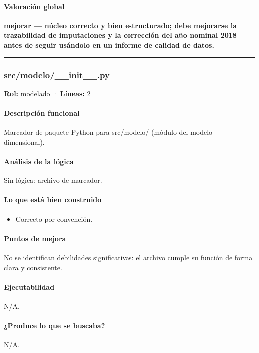 \paragraph{Valoración global}
\textbf{mejorar --- núcleo correcto y bien estructurado; debe mejorarse la trazabilidad de imputaciones y la corrección del año nominal 2018 antes de seguir usándolo en un informe de calidad de datos.}

\medskip
\hrule

\subsubsection{src/modelo/\_\_init\_\_.py}
\textbf{Rol:} modelado · \textbf{Líneas:} 2

\paragraph{Descripción funcional}
Marcador de paquete Python para src/modelo/ (módulo del modelo dimensional).

\paragraph{Análisis de la lógica}
Sin lógica: archivo de marcador.

\paragraph{Lo que está bien construido}
\begin{itemize}
  \item Correcto por convención.
\end{itemize}

\paragraph{Puntos de mejora}
\noindent No se identifican debilidades significativas: el archivo cumple su función de forma clara y consistente.

\paragraph{Ejecutabilidad}
N/A.

\paragraph{¿Produce lo que se buscaba?}
N/A.

